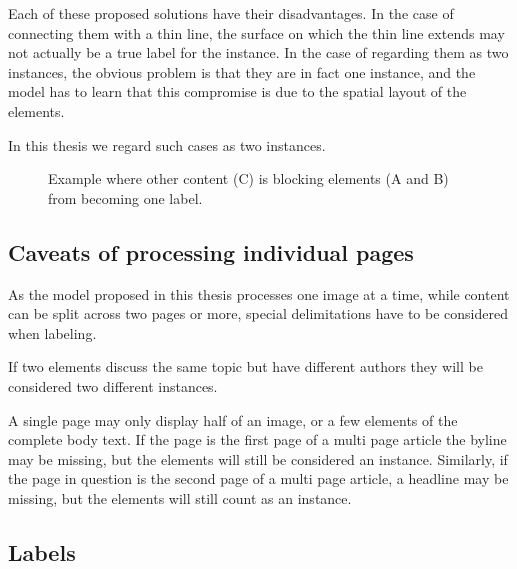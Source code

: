 \documentclass[oneside, english, bibtex]{kththesis}
\begin{document}
Each of these proposed solutions have their disadvantages. In the case of connecting them with a thin line, the surface on which the thin line extends may not actually be a true label for the instance.
In the case of regarding them as two instances, the obvious problem is that they are in fact one instance, and the model has to learn that this compromise is due to the spatial layout of the elements.

In this thesis we regard such cases as two instances.

\begin{figure}[H]
\label{fig:blockingelements}
\caption{Example where other content (C) is blocking elements (A and B) from becoming one label.}
\end{figure}

\subsection{Caveats of processing individual pages}

As the model proposed in this thesis processes one image at a time, while content can be split across two pages or more, special delimitations have to be considered when labeling.

If two elements discuss the same topic but have different authors they will be considered two different instances.

A single page may only display half of an image, or a few elements of the complete body text.
If the page is the first page of a multi page article the byline may be missing, but the elements will still be considered an instance.
Similarly, if the page in question is the second page of a multi page article, a headline may be missing, but the elements will still count as an instance.

\subsection{Labels}
\end{document}
